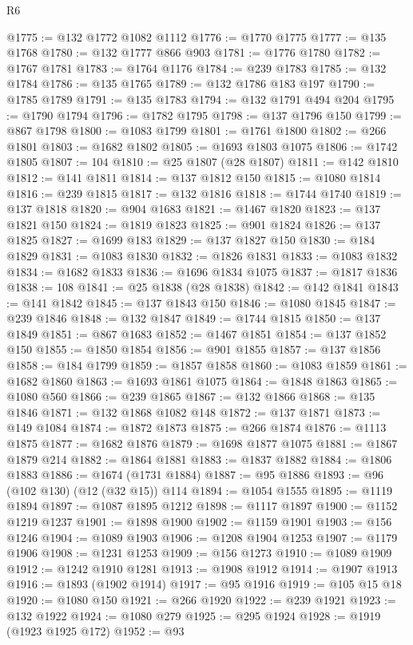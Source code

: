 \begin{lexlean}{R6}
\begin{coremodule}
@1775 := @132 @1772 @1082 @1112
@1776 := @1770 @1775
@1777 := @135 @1768
@1780 := @132 @1777 @866 @903
@1781 := @1776 @1780
@1782 := @1767 @1781
@1783 := @1764 @1176
@1784 := @239 @1783
@1785 := @132 @1784
@1786 := @135 @1765
@1789 := @132 @1786 @183 @197
@1790 := @1785 @1789
@1791 := @135 @1783
@1794 := @132 @1791 @494 @204
@1795 := @1790 @1794
@1796 := @1782 @1795
@1798 := @137 @1796 @150
@1799 := @867 @1798
@1800 := @1083 @1799
@1801 := @1761 @1800
@1802 := @266 @1801
@1803 := @1682 @1802
@1805 := @1693 @1803 @1075
@1806 := @1742 @1805
@1807 := 104
@1810 := @25 @1807 (@28 @1807)
@1811 := @142 @1810
@1812 := @141 @1811
@1814 := @137 @1812 @150
@1815 := @1080 @1814
@1816 := @239 @1815
@1817 := @132 @1816
@1818 := @1744 @1740
@1819 := @137 @1818
@1820 := @904 @1683
@1821 := @1467 @1820
@1823 := @137 @1821 @150
@1824 := @1819 @1823
@1825 := @901 @1824
@1826 := @137 @1825
@1827 := @1699 @183
@1829 := @137 @1827 @150
@1830 := @184 @1829
@1831 := @1083 @1830
@1832 := @1826 @1831
@1833 := @1083 @1832
@1834 := @1682 @1833
@1836 := @1696 @1834 @1075
@1837 := @1817 @1836
@1838 := 108
@1841 := @25 @1838 (@28 @1838)
@1842 := @142 @1841
@1843 := @141 @1842
@1845 := @137 @1843 @150
@1846 := @1080 @1845
@1847 := @239 @1846
@1848 := @132 @1847
@1849 := @1744 @1815
@1850 := @137 @1849
@1851 := @867 @1683
@1852 := @1467 @1851
@1854 := @137 @1852 @150
@1855 := @1850 @1854
@1856 := @901 @1855
@1857 := @137 @1856
@1858 := @184 @1799
@1859 := @1857 @1858
@1860 := @1083 @1859
@1861 := @1682 @1860
@1863 := @1693 @1861 @1075
@1864 := @1848 @1863
@1865 := @1080 @560
@1866 := @239 @1865
@1867 := @132 @1866
@1868 := @135 @1846
@1871 := @132 @1868 @1082 @148
@1872 := @137 @1871
@1873 := @149 @1084
@1874 := @1872 @1873
@1875 := @266 @1874
@1876 := @1113 @1875
@1877 := @1682 @1876
@1879 := @1698 @1877 @1075
@1881 := @1867 @1879 @214
@1882 := @1864 @1881
@1883 := @1837 @1882
@1884 := @1806 @1883
@1886 := @1674 (@1731 @1884)
@1887 := @95 @1886
@1893 := @96 (@102 @130) (@12 (@32 @15)) @114
@1894 := @1054 @1555
@1895 := @1119 @1894
@1897 := @1087 @1895 @1212
@1898 := @1117 @1897
@1900 := @1152 @1219 @1237
@1901 := @1898 @1900
@1902 := @1159 @1901
@1903 := @156 @1246
@1904 := @1089 @1903
@1906 := @1208 @1904 @1253
@1907 := @1179 @1906
@1908 := @1231 @1253
@1909 := @156 @1273
@1910 := @1089 @1909
@1912 := @1242 @1910 @1281
@1913 := @1908 @1912
@1914 := @1907 @1913
@1916 := @1893 (@1902 @1914)
@1917 := @95 @1916
@1919 := @105 @15 @18
@1920 := @1080 @150
@1921 := @266 @1920
@1922 := @239 @1921
@1923 := @132 @1922
@1924 := @1080 @279
@1925 := @295 @1924
@1928 := @1919 (@1923 @1925 @172)
@1952 := @93

\end{coremodule}
\end{lexlean}
